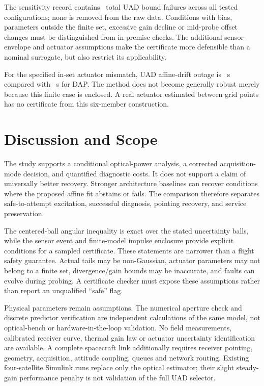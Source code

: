 \documentclass[10pt,journal]{IEEEtran}
\begin{document}
The sensitivity record contains \SensitivityUADBoundFailures\ total UAD bound failures across all tested configurations; none is removed from the raw data. Conditions with bias, parameters outside the finite set, excessive gain decline or mid-probe offset changes must be distinguished from in-premise checks. The additional sensor-envelope and actuator assumptions make the certificate more defensible than a nominal surrogate, but also restrict its applicability.

For the specified in-set actuator mismatch, UAD affine-drift outage is \UADMismatchDriftOutage~s compared with \DAPMismatchDriftOutage~s for DAP. The method does not become generally robust merely because this finite case is enclosed. A real actuator estimated between grid points has no certificate from this six-member construction.



\FloatBarrier
\section{Discussion and Scope}
The study supports a conditional optical-power analysis, a corrected acquisition-mode decision, and quantified diagnostic costs. It does not support a claim of universally better recovery. Stronger architecture baselines can recover conditions where the proposed affine fit abstains or fails. The comparison therefore separates safe-to-attempt excitation, successful diagnosis, pointing recovery, and service preservation.

The centered-ball angular inequality is exact over the stated uncertainty balls, while the sensor event and finite-model impulse enclosure provide explicit conditions for a sampled certificate. These statements are narrower than a flight safety guarantee. Actual tails may be non-Gaussian, actuator parameters may not belong to a finite set, divergence/gain bounds may be inaccurate, and faults can evolve during probing. A certificate checker must expose these assumptions rather than report an unqualified ``safe'' flag.

Physical parameters remain assumptions. The numerical aperture check and discrete predictor verification are independent calculations of the same model, not optical-bench or hardware-in-the-loop validation. No field measurements, calibrated receiver curve, thermal gain law or actuator uncertainty identification are available. A complete spacecraft link additionally requires receiver pointing, geometry, acquisition, attitude coupling, queues and network routing. Existing four-satellite Simulink runs replace only the optical estimator; their slight steady-gain performance penalty is not validation of the full UAD selector.
\end{document}
